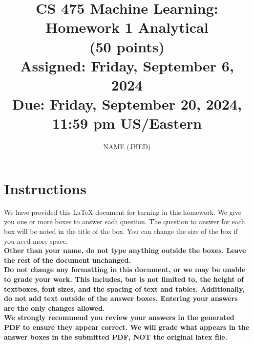 \documentclass[11pt]{article}
\title{CS 475 Machine Learning: Homework 1 Analytical \\
(50 points)\\
\Large{Assigned: Friday, September 6, 2024} \\
\Large{Due: Friday, September 20, 2024, 11:59 pm US/Eastern}}
\author{NAME (JHED)}
\date{}
\renewcommand{\vec}[1]{\mathbf{#1}}
\begin{document}
\maketitle
\thispagestyle{headings}

\section*{Instructions }
We have provided this \LaTeX{} document for turning in this homework. We give you one or more boxes to answer each question.  The question to answer for each box will be noted in the title of the box.  You can change the size of the box if you need more space.\\

{\bf Other than your name, do not type anything outside the boxes. Leave the rest of the document unchanged.}\\


\textbf{Do not change any formatting in this document, or we may be unable to
  grade your work. This includes, but is not limited to, the height of
  textboxes, font sizes, and the spacing of text and tables.  Additionally, do
  not add text outside of the answer boxes. Entering your answers are the only
  changes allowed.}\\


\textbf{We strongly recommend you review your answers in the generated PDF to
  ensure they appear correct. We will grade what appears in the answer boxes in
  the submitted PDF, NOT the original latex file.}

\end{document}
